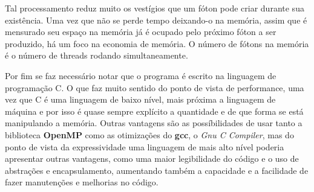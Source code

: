   Tal processamento reduz muito os vestígios que um fóton pode criar durante sua existência. Uma vez que não se perde tempo deixando-o na memória, assim que é mensurado seu espaço na memória já é ocupado pelo próximo fóton a ser produzido, há um foco na economia de memória. O número de fótons na memória é o número de threads rodando simultaneamente.

  Por fim se faz necessário notar que o programa é escrito na linguagem de programação C. O que faz muito sentido do ponto de vista de performance, uma vez que C é uma linguagem de baixo nível, mais próxima a linguagem de máquina e por isso é quase sempre explícito a quantidade e de que forma se está manipulando a memória. Outras vantagens são as possíbilidades de usar tanto a biblioteca \textbf{OpenMP} como as otimizações do \textbf{gcc}, o \textit{Gnu C Compiler}, mas do ponto de vista da expressividade uma linguagem de mais alto nível poderia apresentar outras vantagens, como uma maior legibilidade do código e o uso de abstrações e encapsulamento, aumentando também a capacidade e a facilidade de fazer manutenções e melhorias no código.
